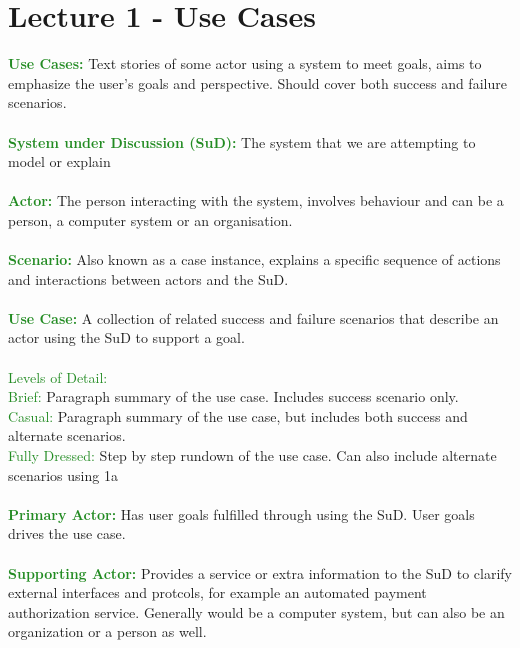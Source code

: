 \documentclass[a4paper,10pt]{article}
\begin{document}
\section*{Lecture 1 - Use Cases}
\textcolor{ForestGreen}{\textbf{Use Cases:}} Text stories of some actor using a system to meet goals, aims to emphasize the user's goals and perspective. Should cover both success and failure scenarios. \\ \\
\textcolor{ForestGreen}{\textbf{System under Discussion (SuD):}} The system that we are attempting to model or explain \\\\
\textcolor{ForestGreen}{\textbf{Actor:}} The person interacting with the system, involves behaviour and can be a person, a computer system or an organisation.\\\\
\textcolor{ForestGreen}{\textbf{Scenario:}} Also known as a case instance, explains a specific sequence of actions and interactions between actors and the SuD. \\\\
\textcolor{ForestGreen}{\textbf{Use Case:}} A collection of related success and failure scenarios that describe an actor using the SuD to support a goal.\\\\
\indent \textcolor{ForestGreen}{Levels of Detail:} \\
\indent \textcolor{ForestGreen}{Brief:} Paragraph summary of the use case. Includes success scenario only. \\
\indent \textcolor{ForestGreen}{Casual:} Paragraph summary of the use case, but includes both success and alternate scenarios. \\
\indent \textcolor{ForestGreen}{Fully Dressed:} Step by step rundown of the use case. Can also include alternate scenarios using 1a\\ \\
\textcolor{ForestGreen}{\textbf{Primary Actor:}} Has user goals fulfilled through using the SuD. User goals drives the use case.\\\\
\textcolor{ForestGreen}{\textbf{Supporting Actor:}} Provides a service or extra information to the SuD to clarify external interfaces and protcols, for example an automated payment authorization service. Generally would be a computer system, but can also be an organization or a person as well.\\\\
\end{document}
